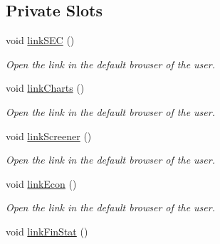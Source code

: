 \subsection*{Private Slots}
\begin{DoxyCompactItemize}
\item 
\hypertarget{class_t_k_r_t_a_p_a0fd918db6da7ef497b167f3af9a21204}{void \hyperlink{class_t_k_r_t_a_p_a0fd918db6da7ef497b167f3af9a21204}{link\+S\+E\+C} ()}\label{class_t_k_r_t_a_p_a0fd918db6da7ef497b167f3af9a21204}

\begin{DoxyCompactList}\small\item\em Open the link in the default browser of the user. \end{DoxyCompactList}\item 
\hypertarget{class_t_k_r_t_a_p_a5f1ebaf5fe11868b7aa882f2c734e4b2}{void \hyperlink{class_t_k_r_t_a_p_a5f1ebaf5fe11868b7aa882f2c734e4b2}{link\+Charts} ()}\label{class_t_k_r_t_a_p_a5f1ebaf5fe11868b7aa882f2c734e4b2}

\begin{DoxyCompactList}\small\item\em Open the link in the default browser of the user. \end{DoxyCompactList}\item 
\hypertarget{class_t_k_r_t_a_p_acefe694e3e0bf827a51817eaaca3e0da}{void \hyperlink{class_t_k_r_t_a_p_acefe694e3e0bf827a51817eaaca3e0da}{link\+Screener} ()}\label{class_t_k_r_t_a_p_acefe694e3e0bf827a51817eaaca3e0da}

\begin{DoxyCompactList}\small\item\em Open the link in the default browser of the user. \end{DoxyCompactList}\item 
\hypertarget{class_t_k_r_t_a_p_aeb83e283359840bee97909a92564e324}{void \hyperlink{class_t_k_r_t_a_p_aeb83e283359840bee97909a92564e324}{link\+Econ} ()}\label{class_t_k_r_t_a_p_aeb83e283359840bee97909a92564e324}

\begin{DoxyCompactList}\small\item\em Open the link in the default browser of the user. \end{DoxyCompactList}\item 
\hypertarget{class_t_k_r_t_a_p_aa0d9e2c05ad6640909eca54f995b04e7}{void \hyperlink{class_t_k_r_t_a_p_aa0d9e2c05ad6640909eca54f995b04e7}{link\+Fin\+Stat} ()}\label{class_t_k_r_t_a_p_aa0d9e2c05ad6640909eca54f995b04e7}


\end{DoxyCompactItemize}

